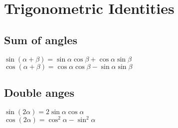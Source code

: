 \section{Trigonometric Identities}
\subsection*{Sum of angles}
$\sin(\alpha + \beta) = \sin \alpha \cos \beta + \cos \alpha \sin
\beta$\\
$\cos(\alpha + \beta) = \cos \alpha \cos \beta - \sin \alpha \sin \beta$
\subsection*{Double anges}
$\sin(2 \alpha) = 2 \sin \alpha \cos \alpha$\\
$\cos(2 \alpha) = \cos^2 \alpha - \sin^2 \alpha$

